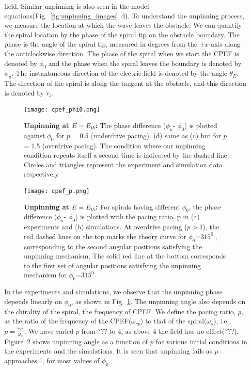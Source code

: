 field. Similar unpinning
is also seen in the model equations(Fig.~\ref{fig:unpinning_images}~d). To
understand the unpinning process, we measure the location at which the wave
leaves the obstacle. We can quantify the spiral location by the phase of the
spiral tip on the obstacle boundary. The phase is the angle of
the spiral tip, measured in degrees from the $+x$-axis along the anticlockwise
direction. The phase of the spiral when we start the CPEF is denoted by
$\phi_0$ and the phase when the spiral leaves the boundary is denoted by
$\phi_u$. The instantaneous direction of the electric
field is denoted by the angle $\theta_E$. The direction of the spiral
is along the tangent at the obstacle, and this direction is denoted by
${\hat{r}}_{t}$.  


\begin{figure}[htb!]
    \centering
    \texttt{[image: cpef\_phi0.png]}
    \caption{\textbf{Unpinning at $E = E_{th}$:} 
     The phase difference (${\phi}_u$- ${\phi}_0$) is plotted against
	${\phi}_0$ for $p$ = 0.5 (underdrive pacing). (d) same as (c) but for
	$p$ = 1.5 (overdrive pacing). The condition where our unpinning
	condition repeats itself a second time is indicated by the dashed line.
	Circles and triangles represent the experiment and simulation data
	respectively.  
    }
    \label{fig:unpinning_EthA}
\end{figure}
\begin{figure}[htb!]
    \centering
    \texttt{[image: cpef\_p.png]}
    \caption{\textbf{Unpinning at $E = E_{th}$:} 
	For spirals having different
	${\phi}_0$,  the phase difference (${\phi}_u$- ${\phi}_0$) is plotted
	with the pacing ratio, p in (a) experiments and (b) simulations. At
	overdrive pacing ($p>$1), the red dashed lines on the top marks the
	theory curve for ${\phi}_0$=$315^0$ , corresponding to the second
	angular positions satisfying the unpinning mechanism. The solid red
	line at the bottom corresponds to the first set of angular positions
	satisfying the unpinning mechanism for ${\phi}_0$=$315^0$.
	}
    \label{fig:unpinning_EthB}
\end{figure}
In the experiments and simulations, we observe that the unpinning phase
depends linearly on $\phi_0$, as shown in Fig.~\ref{fig:unpinning_EthA}. The
unpinning angle also depends on the chirality of the spiral, the frequency of
CPEF. We define the pacing ratio, $p$, as the ratio of the frequency of the
CPEF($\omega_{cp}$) to that of the spiral($\omega_s$), {i.e.,} \( p=
\frac{\omega_{cp}}{\omega_{s}}\). We have varied $p$ from ??? to 4, as above 4
the field has no effect(???). Figure~\ref{fig:unpinning_EthB} shows unpinning
angle as a function of $p$ for various initial conditions in the experiments
and the simulations. It is seen that unpinning fails as $p$ approaches 1, for
most values of $\phi_0$. 


